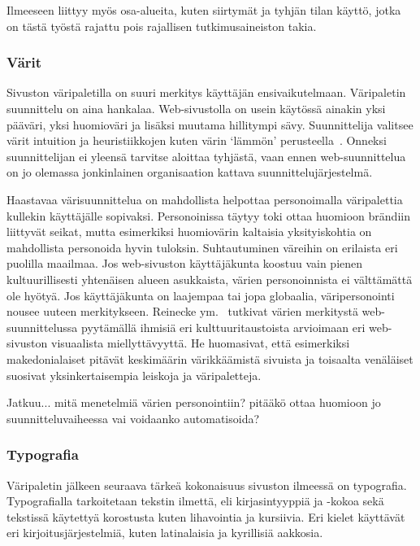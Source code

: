 \documentclass[finnish, 12pt, a4paper, elec, utf8, a-1b, online]{aaltothesis}
\begin{document}
Ilmeeseen liittyy myös osa-alueita, kuten siirtymät ja tyhjän tilan käyttö,
jotka on tästä työstä rajattu pois rajallisen tutkimusaineiston takia.

\subsubsection{Värit}

Sivuston väripaletilla on suuri merkitys käyttäjän
ensivaikutelmaan\cite{10.1145/2470654.2481281}. Väripaletin suunnittelu on aina
hankalaa. Web-sivustolla on usein käytössä ainakin yksi pääväri, yksi huomioväri
ja lisäksi muutama hillitympi sävy. Suunnittelija valitsee värit intuition ja
heuristiikkojen kuten värin `lämmön' perusteella~\cite{odonovan_2015}. Onneksi
suunnittelijan ei yleensä tarvitse aloittaa tyhjästä, vaan ennen
web-suunnittelua on jo olemassa jonkinlainen organisaation kattava
suunnittelujärjestelmä.

Haastavaa värisuunnittelua on mahdollista helpottaa personoimalla väripalettia
kullekin käyttäjälle sopivaksi. Personoinissa täytyy toki ottaa huomioon
brändiin liittyvät seikat, mutta esimerkiksi huomiovärin kaltaisia
yksityiskohtia on mahdollista personoida hyvin tuloksin. Suhtautuminen väreihin
on erilaista eri puolilla maailmaa. Jos web-sivuston käyttäjäkunta koostuu vain
pienen kultuurillisesti yhtenäisen alueen asukkaista, värien personoinnista ei
välttämättä ole hyötyä. Jos käyttäjäkunta on laajempaa tai jopa globaalia,
väripersonointi nousee uuteen merkitykseen. Reinecke
ym.~\cite{10.1145/2556288.2557052} tutkivat värien merkitystä web-suunnittelussa
pyytämällä ihmisiä eri kulttuuritaustoista arvioimaan eri web-sivuston
visuaalista miellyttävyyttä. He huomasivat, että esimerkiksi makedonialaiset
pitävät keskimäärin värikkäämistä sivuista ja toisaalta venäläiset suosivat
yksinkertaisempia leiskoja ja väripaletteja.

Jatkuu... mitä menetelmiä värien personointiin? pitääkö ottaa huomioon jo
suunnitteluvaiheessa vai voidaanko automatisoida?

\subsubsection{Typografia}

Väripaletin jälkeen seuraava tärkeä kokonaisuus sivuston ilmeessä on typografia.
Typografialla tarkoitetaan tekstin ilmettä, eli kirjasintyyppiä ja -kokoa sekä
tekstissä käytettyä korostusta kuten lihavointia ja kursiivia. Eri kielet
käyttävät eri kirjoitusjärjestelmiä, kuten latinalaisia ja kyrillisiä aakkosia.
\end{document}
